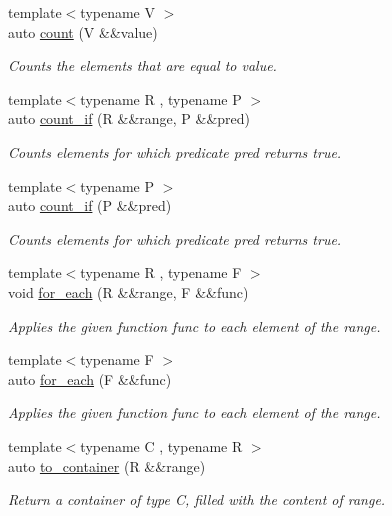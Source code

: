 \begin{DoxyCompactItemize}
{\footnotesize template$<$typename V $>$ }\\auto \mbox{\hyperlink{namespacerah_ae8400202fc4005dbade0f479dd556ec3}{count}} (V \&\&value)
\begin{DoxyCompactList}\small\item\em Counts the elements that are equal to value. \end{DoxyCompactList}\item 
{\footnotesize template$<$typename R , typename P $>$ }\\auto \mbox{\hyperlink{namespacerah_a8e6a379c05d482a52137f5647783fe27}{count\+\_\+if}} (R \&\&range, P \&\&pred)
\begin{DoxyCompactList}\small\item\em Counts elements for which predicate pred returns true. \end{DoxyCompactList}\item 
{\footnotesize template$<$typename P $>$ }\\auto \mbox{\hyperlink{namespacerah_a9e22b56a1f28a353659fed572f33f5a9}{count\+\_\+if}} (P \&\&pred)
\begin{DoxyCompactList}\small\item\em Counts elements for which predicate pred returns true. \end{DoxyCompactList}\item 
{\footnotesize template$<$typename R , typename F $>$ }\\void \mbox{\hyperlink{namespacerah_afe6ed477fd9ab2f873d76a4b50ffac39}{for\+\_\+each}} (R \&\&range, F \&\&func)
\begin{DoxyCompactList}\small\item\em Applies the given function func to each element of the range. \end{DoxyCompactList}\item 
{\footnotesize template$<$typename F $>$ }\\auto \mbox{\hyperlink{namespacerah_a76e2ce1a497aa3726cc9d99fb320ac67}{for\+\_\+each}} (F \&\&func)
\begin{DoxyCompactList}\small\item\em Applies the given function func to each element of the range. \end{DoxyCompactList}\item 
{\footnotesize template$<$typename C , typename R $>$ }\\auto \mbox{\hyperlink{namespacerah_a11fcae12055a2bcf5ac7c41e25e74a32}{to\+\_\+container}} (R \&\&range)
\begin{DoxyCompactList}\small\item\em Return a container of type C, filled with the content of range. \end{DoxyCompactList}\item 

\end{DoxyCompactItemize}
